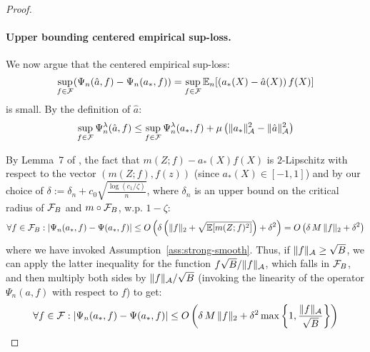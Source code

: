 \begin{proof}
\paragraph{Upper bounding centered empirical sup-loss.} We now argue that the centered empirical sup-loss: 
$$\sup_{f \in {\mathcal F}} (\Psi_n(\hat{a}, f) - \Psi_n(a_*, f)) = \sup_{f \in {\mathcal F}} \mathbb{E}_n[(a_*(X)-\hat{a}(X))\, f(X)]$$ 
is small. By the definition of $\hat{a}$:
\begin{equation}\label{eqn:reg-optimality}
\sup_{f\in {\mathcal F}} \Psi_n^{\lambda}(\hat{a}, f) \leq \sup_{f\in {\mathcal F}} \Psi_n^{\lambda}(a_*, f) + \mu \left(\|a_*\|_{{\mathcal A}}^2 - \|\hat{a}\|_{{\mathcal A}}^2\right)
\end{equation}

By Lemma~7 of \cite{Foster2019}, the fact that $m(Z; f) - a_*(X) f(X)$ is $2$-Lipschitz with respect to the vector $(m(Z;f), f(z))$ (since $a_*(X)\in [-1, 1]$) and by our choice of $\delta:=\delta_n + c_0 \sqrt{\frac{\log(c_1/\zeta)}{n}}$, where $\delta_n$ is an upper bound on the critical radius of ${\mathcal F}_{B}$ and $m \circ {\mathcal F}_B$, w.p. $1-\zeta$:
\begin{align}
 \forall f\in {\mathcal F}_{B}: \left|\Psi_n(a_*, f) - \Psi(a_*, f)\right| \leq O\left(\delta \left(\|f\|_2 + \sqrt{\mathbb{E}[m(Z;f)^2]}\right) + \delta^2\right)
 =O\left(\delta\, M\, \|f\|_2 + \delta^2\right)
\end{align}
where we have invoked Assumption~\ref{ass:strong-smooth}. Thus, if $\|f\|_{{\mathcal A}} \geq \sqrt{B}$, we can apply the latter inequality for the function $f \sqrt{B}/\|f\|_{{\mathcal A}}$, which falls in ${\mathcal F}_{B}$, and then multiply both sides by $\|f\|_{{\mathcal A}}/\sqrt{B}$ (invoking the linearity of the operator $\Psi_n(a, f)$ with respect to $f$) to get:
\begin{align}\label{eqn:reg-concentration}
    \forall f \in {\mathcal F}: \left|\Psi_n(a_*, f) - \Psi(a_*, f)\right| \leq O\left(\delta\, M\, \|f\|_2 + \delta^2 \max\left\{1, \frac{\|f\|_{{\mathcal A}}}{\sqrt{B}}\right\}\right) 
\end{align}


\end{proof}
